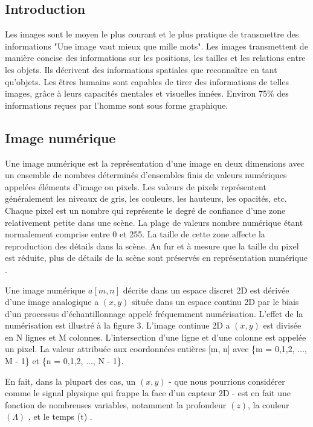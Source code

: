 \documentclass[12pt]{article}
\begin{document}
\subsection{Introduction}
Les images sont le moyen le plus courant et le plus pratique de transmettre des informations "Une image vaut mieux que mille mots". Les images transmettent de manière concise des informations sur les positions, les tailles et les relations entre les objets. Ils décrivent des informations spatiales que reconnaître en tant qu'objets. Les êtres humains sont capables de tirer des informations de telles images, grâce à leurs capacités mentales et visuelles innées. Environ 75\% des informations reçues par l'homme sont sous forme graphique.

\subsection{Image numérique}
Une image numérique est la représentation d'une image en deux dimensions avec un ensemble de nombres déterminés d'ensembles finis de valeurs numériques appelées éléments d'image ou pixels. Les valeurs de pixels représentent généralement les niveaux de gris, les couleurs, les hauteurs, les opacités, etc. Chaque pixel est un nombre qui représente le degré de confiance d'une zone relativement petite dans une scène. La plage de valeurs nombre numérique étant normalement comprise entre 0 et 255. La taille de cette zone affecte la reproduction des détails dans la scène. Au fur et à mesure que la taille du pixel est réduite, plus de détails de la scène sont préservés en représentation numérique \cite{12}.

Une image numérique $a[m, n]$ décrite dans un espace discret 2D est dérivée d'une image analogique a $(x, y)$ située dans un espace continu 2D par le biais d'un processus d'échantillonnage appelé fréquemment numérisation. L'effet de la numérisation est illustré à la figure 3. L'image continue 2D a $(x, y)$ est divisée en N lignes et M colonnes. L'intersection d'une ligne et d'une colonne est appelée un pixel. La valeur attribuée aux coordonnées entières [m, n] avec \{m = 0,1,2, ..., M - 1\} et \{n = 0,1,2, ..., N - 1\}.

En fait, dans la plupart des cas, un $(x, y)$ - que nous pourrions considérer comme le signal physique qui frappe la face d’un capteur 2D - est en fait une fonction de nombreuses variables, notamment la profondeur $(z)$, la couleur $(\Lambda)$ ,  et le temps (t) \cite{13}.
\end{document}
